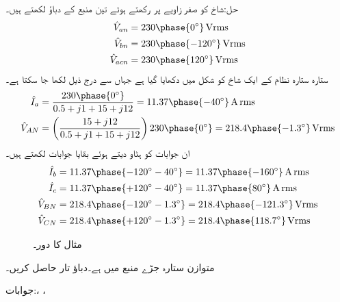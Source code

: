 حل:شاخ  کو صفر زاویے پر رکھتے ہوئے  تین منبع کے دباؤ لکھتے ہیں۔
\begin{align*}
\hat{V}_{an}&=230\phase{0^{\circ}}\,\si{\volt\rms}\\
\hat{V}_{bn}&=230\phase{-120^{\circ}}\,\si{\volt\rms}\\
\hat{V}_{acn}&=230\phase{120^{\circ}}\,\si{\volt\rms}
\end{align*}
ستارہ ستارہ نظام کے ایک شاخ کو شکل  میں دکھایا گیا ہے جہاں سے درج ذیل لکھا جا سکتا ہے۔
\begin{align*}
\hat{I}_a&=\frac{230\phase{0^{\circ}}}{0.5+j1+15+j12}=11.37\phase{-40^{\circ}}\,\si{\ampere}\,\rms\\
\hat{V}_{AN}&=\left(\frac{15+j12}{0.5+j1+15+j12}\right) 230\phase{0^{\circ}}=218.4\phase{-1.3^{\circ}}\,\si{\volt\rms}
\end{align*}
ان جوابات کو  ہٹاو دیتے ہوئے بقایا جوابات لکھتے ہیں۔
\begin{align*}
\hat{I}_b&=11.37\phase{-120^{\circ}-40^{\circ}}=11.37\phase{-160^{\circ}}\,\si{\ampere}\,\rms\\
\hat{I}_c&=11.37\phase{+120^{\circ}-40^{\circ}}=11.37\phase{80^{\circ}}\,\si{\ampere}\,\rms\\
\hat{V}_{BN}&=218.4\phase{-120^{\circ}-1.3^{\circ}}=218.4\phase{-121.3^{\circ}}\,\si{\volt\rms}\\
\hat{V}_{CN}&=218.4\phase{+120^{\circ}-1.3^{\circ}}=218.4\phase{118.7^{\circ}}\,\si{\volt\rms}
\end{align*} 
%
\begin{figure}
\centering
{}
\caption{مثال  کا دور۔}
\label{شکل_تین_دوری_ستارہ_ستارہ_بوجھ_رکاوٹ_الف}
\end{figure}
متوازن  ستارہ جڑے منبع میں  ہے۔دباؤ تار حاصل کریں۔

جوابات:، ، 

